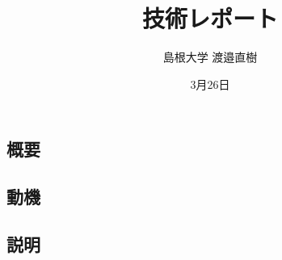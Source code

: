 \documentclass[10.5pt, a4paper]{jsarticle}
\title{技術レポート}
\author{島根大学 渡邉直樹}
\date{3月26日}
\begin{document}
\maketitle

\subsection{概要}

\subsection{動機}

\subsection{説明}
\end{document}
